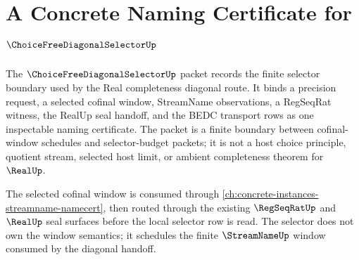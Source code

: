 \chapter{A Concrete Naming Certificate for $\ChoiceFreeDiagonalSelectorUp$}
\label{ch:concrete-instances-choicefreediagonalselector-namecert}

The $\ChoiceFreeDiagonalSelectorUp$ packet records the finite selector boundary used by the Real completeness diagonal route. It binds a precision request, a selected cofinal window, StreamName observations, a RegSeqRat witness, the RealUp seal handoff, and the BEDC transport rows as one inspectable naming certificate. The packet is a finite boundary between cofinal-window schedules and selector-budget packets; it is not a host choice principle, quotient stream, selected host limit, or ambient completeness theorem for $\RealUp$.

The selected cofinal window is consumed through \autoref{ch:concrete-instances-streamname-namecert}, then routed through the existing $\RegSeqRatUp$ and $\RealUp$ seal surfaces before the local selector row is read. The selector does not own the window semantics; it schedules the finite $\StreamNameUp$ window consumed by the diagonal handoff.

